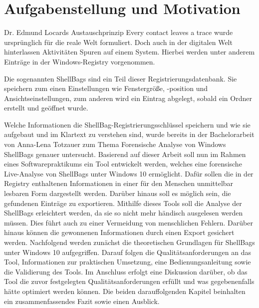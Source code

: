 \section{Aufgabenstellung und Motivation}
\vspace{0.5cm}
Dr. Edmund Locards Austauschprinzip \glqq Every contact leaves a trace\grqq{} wurde ursprünglich für die reale Welt formuliert. Doch auch in der digitalen Welt hinterlassen Aktivitäten Spuren auf einem System. Hierbei werden unter anderem Einträge in der Windows-Registry vorgenommen. \cite[S.5]{carvey2011windows} 

Die sogenannten ShellBags sind ein Teil dieser Registrierungsdatenbank. Sie speichern zum einen Einstellungen wie Fenstergröße, -position und Ansichtseinstellungen, zum anderen wird ein Eintrag abgelegt, sobald ein Ordner erstellt und geöffnet wurde. \cite[S.26]{kavrestad2018fundamentals} 

Welche Informationen die ShellBag-Registrierungsschlüssel speichern und wie sie aufgebaut und im Klartext zu verstehen sind, wurde bereits in der Bachelorarbeit von Anna-Lena Totzauer zum Thema \glqq Forensische Analyse von Windows ShellBags\grqq{} genauer untersucht. Basierend auf dieser Arbeit soll nun im Rahmen eines Softwarepraktikums ein Tool entwickelt werden, welches eine forensische Live-Analyse von ShellBags unter Windows 10 ermöglicht. Dafür sollen die in der Registry enthaltenen Informationen in einer für den Menschen unmittelbar lesbaren Form dargestellt werden. Darüber hinaus soll es möglich sein, die gefundenen Einträge zu exportieren. Mithilfe dieses Tools soll die Analyse der ShellBags erleichtert werden, da sie so nicht mehr händisch ausgelesen werden müssen. Dies führt auch zu einer Vermeidung von menschlichen Fehlern.  Darüber hinaus können die gewonnenen Informationen durch einen Export gesichert werden. \newline
Nachfolgend werden zunächst die theoretischen Grundlagen für ShellBags unter Windows 10 aufgegriffen. Darauf folgen die Qualitätsanforderungen an das Tool, Informationen zur praktischen Umsetzung, eine Bedienungsanleitung sowie die Validierung des Tools. Im Anschluss erfolgt eine Diskussion darüber, ob das Tool die zuvor festgelegten Qualitätsanforderungen erfüllt und was gegebenenfalls hätte optimiert werden können. Die beiden darauffolgenden Kapitel beinhalten ein zusammenfassendes Fazit sowie einen Ausblick. 

